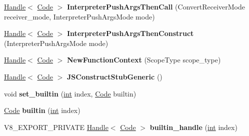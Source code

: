 \begin{DoxyCompactItemize}
\item 
\mbox{\label{classv8_1_1internal_1_1Builtins_a92403d4b745023dd2c0742810f9359de}} 
\mbox{\hyperlink{classv8_1_1internal_1_1Handle}{Handle}}$<$ \mbox{\hyperlink{classv8_1_1internal_1_1Code}{Code}} $>$ {\bfseries Interpreter\+Push\+Args\+Then\+Call} (Convert\+Receiver\+Mode receiver\+\_\+mode, Interpreter\+Push\+Args\+Mode mode)
\item 
\mbox{\label{classv8_1_1internal_1_1Builtins_aaae7ac23fe4b8ae389478c3749fc851c}} 
\mbox{\hyperlink{classv8_1_1internal_1_1Handle}{Handle}}$<$ \mbox{\hyperlink{classv8_1_1internal_1_1Code}{Code}} $>$ {\bfseries Interpreter\+Push\+Args\+Then\+Construct} (Interpreter\+Push\+Args\+Mode mode)
\item 
\mbox{\label{classv8_1_1internal_1_1Builtins_a5c67e84d1914420a2d1f25042f1c11b6}} 
\mbox{\hyperlink{classv8_1_1internal_1_1Handle}{Handle}}$<$ \mbox{\hyperlink{classv8_1_1internal_1_1Code}{Code}} $>$ {\bfseries New\+Function\+Context} (Scope\+Type scope\+\_\+type)
\item 
\mbox{\label{classv8_1_1internal_1_1Builtins_a2dac24de5e5effd92c56b84d101e95e3}} 
\mbox{\hyperlink{classv8_1_1internal_1_1Handle}{Handle}}$<$ \mbox{\hyperlink{classv8_1_1internal_1_1Code}{Code}} $>$ {\bfseries J\+S\+Construct\+Stub\+Generic} ()
\item 
\mbox{\label{classv8_1_1internal_1_1Builtins_abf5a3eab230ae79a3c9c7b2012904371}} 
void {\bfseries set\+\_\+builtin} (\mbox{\hyperlink{classint}{int}} index, \mbox{\hyperlink{classv8_1_1internal_1_1Code}{Code}} builtin)
\item 
\mbox{\label{classv8_1_1internal_1_1Builtins_ac10d50b0ae39206244892d0557155cfe}} 
\mbox{\hyperlink{classv8_1_1internal_1_1Code}{Code}} {\bfseries builtin} (\mbox{\hyperlink{classint}{int}} index)
\item 
\mbox{\label{classv8_1_1internal_1_1Builtins_a2a020d0ae21ceedcefcf99153f3afe5c}} 
V8\+\_\+\+E\+X\+P\+O\+R\+T\+\_\+\+P\+R\+I\+V\+A\+TE \mbox{\hyperlink{classv8_1_1internal_1_1Handle}{Handle}}$<$ \mbox{\hyperlink{classv8_1_1internal_1_1Code}{Code}} $>$ {\bfseries builtin\+\_\+handle} (\mbox{\hyperlink{classint}{int}} index)

\end{DoxyCompactItemize}
